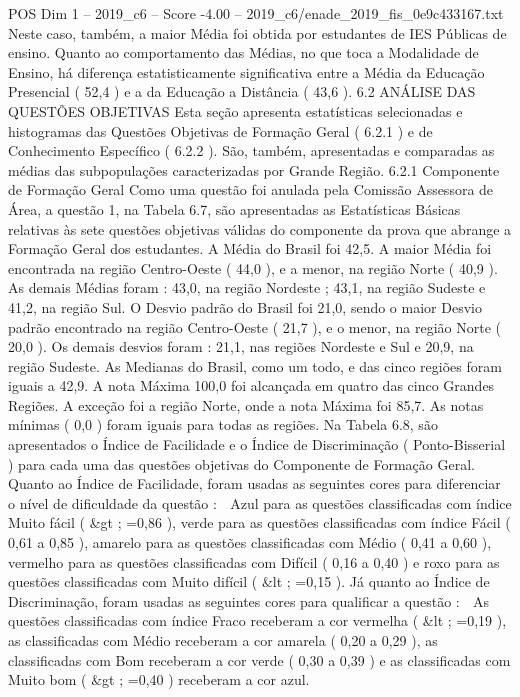\begin{textsample}{POS Dim 1 – 2019\_c6 – Score -4.00 – 2019\_c6/enade\_2019\_fis\_0e9c433167.txt}
Neste caso, também, a maior Média foi obtida por estudantes de IES Públicas de ensino.
Quanto ao comportamento das Médias, no que toca a Modalidade de Ensino, há diferença estatisticamente significativa entre a Média da Educação Presencial ( 52,4 ) e a da Educação a Distância ( 43,6 ). 6.2 ANÁLISE DAS QUESTÕES OBJETIVAS Esta seção apresenta estatísticas selecionadas e histogramas das Questões Objetivas de Formação Geral ( 6.2.1 ) e de Conhecimento Específico ( 6.2.2 ).
São, também, apresentadas e comparadas as médias das subpopulações caracterizadas por Grande Região. 6.2.1 Componente de Formação Geral Como uma questão foi anulada pela Comissão Assessora de Área, a questão 1, na Tabela 6.7, são apresentadas as Estatísticas Básicas relativas às sete questões objetivas válidas do componente da prova que abrange a Formação Geral dos estudantes.
A Média do Brasil foi 42,5.
A maior Média foi encontrada na região Centro-Oeste ( 44,0 ), e a menor, na região Norte ( 40,9 ).
As demais Médias foram : 43,0, na região Nordeste ; 43,1, na região Sudeste e 41,2, na região Sul.
O Desvio padrão do Brasil foi 21,0, sendo o maior Desvio padrão encontrado na região Centro-Oeste ( 21,7 ), e o menor, na região Norte ( 20,0 ).
Os demais desvios foram : 21,1, nas regiões Nordeste e Sul e 20,9, na região Sudeste.
As Medianas do Brasil, como um todo, e das cinco regiões foram iguais a 42,9.
A nota Máxima 100,0 foi alcançada em quatro das cinco Grandes Regiões.
A exceção foi a região Norte, onde a nota Máxima foi 85,7.
As notas mínimas ( 0,0 ) foram iguais para todas as regiões.
Na Tabela 6.8, são apresentados o Índice de Facilidade e o Índice de Discriminação ( Ponto-Bisserial ) para cada uma das questões objetivas do Componente de Formação Geral.
Quanto ao Índice de Facilidade, foram usadas as seguintes cores para diferenciar o nível de dificuldade da questão :  Azul para as questões classificadas com índice Muito fácil ( \&gt ; =0,86 ), verde para as questões classificadas com índice Fácil ( 0,61 a 0,85 ), amarelo para as questões classificadas com Médio ( 0,41 a 0,60 ), vermelho para as questões classificadas com Difícil ( 0,16 a 0,40 ) e roxo para as questões classificadas com Muito difícil ( \&lt ; =0,15 ).
Já quanto ao Índice de Discriminação, foram usadas as seguintes cores para qualificar a questão :  As questões classificadas com índice Fraco receberam a cor vermelha ( \&lt ; =0,19 ), as classificadas com Médio receberam a cor amarela ( 0,20 a 0,29 ), as classificadas com Bom receberam a cor verde ( 0,30 a 0,39 ) e as classificadas com Muito bom ( \&gt ; =0,40 ) receberam a cor azul.

\end{textsample}
